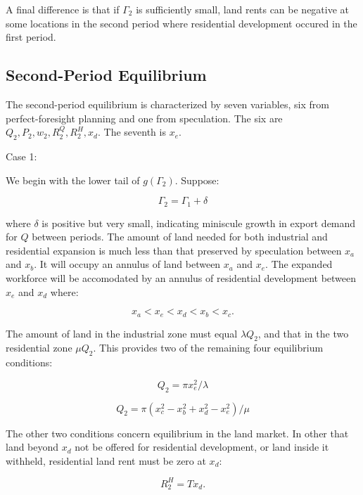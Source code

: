 A final difference is that if $\Gamma_2$ is sufficiently small, land rents can be negative at some locations in the second period where residential development occured in the first period.

\subsection{Second-Period Equilibrium}

The second-period equilibrium is characterized by seven variables, six from perfect-foresight planning and one from speculation. The six are $Q_2, P_2, w_2, R_2^Q, R_2^H, x_d$. The seventh is $x_e$. 

Case 1:

We begin with the lower tail of $g(\Gamma_2)$. Suppose:

\begin{equation*}
    \Gamma_2 = \Gamma_1 + \delta
\end{equation*}

where $\delta$ is positive but very small, indicating miniscule growth in export demand for $Q$ between periods. The amount of land needed for both industrial and residential expansion is much less than that preserved by speculation between $x_a$ and $x_b$. It will occupy an annulus of land between $x_a$ and $x_e$. The expanded workforce will be accomodated by an annulus of residential development between $x_e$ and $x_d$ where:

\begin{equation*}
    x_a < x_e < x_d < x_b < x_c.
\end{equation*}

The amount of land in the industrial zone must equal $\lambda Q_2$, and that in the two residential zone $\mu Q_2$. This provides two of the remaining four equilibrium conditions:

\begin{equation}
    Q_2 = \pi x_e^2 / \lambda
\end{equation}

\begin{equation}
    Q_2 = \pi(x_c^2 - x_b^2 + x_d^2 - x_e^2) / \mu
\end{equation}

The other two conditions concern equilibrium in the land market. In other that land beyond $x_d$ not be offered for residential development, or land inside it withheld, residential land rent must be zero at $x_d$:

\begin{equation}
    R_2^H = Tx_d. \label{sepculation_residential_land_rent}
\end{equation}


